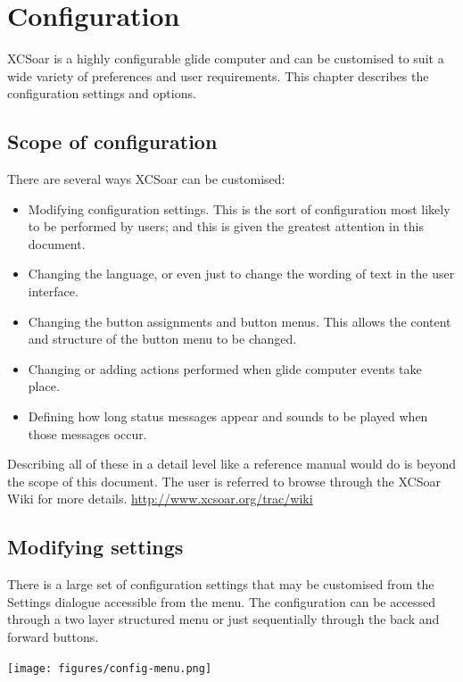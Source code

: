 \chapter{Configuration}\label{cha:configuration}
XCSoar is a highly configurable glide computer and can be customised
to suit a wide variety of preferences and user requirements.  This
chapter describes the configuration settings and options.

\section{Scope of configuration}

There are several ways XCSoar can be customised:
\begin{itemize}

\item Modifying configuration settings.  This is the sort of configuration
  most likely to be performed by users; and this is given the greatest attention 
  in this document.
\item Changing the language, or even just to change the wording
  of text in the user interface.
\item Changing the button assignments and button menus.  This allows 
  the content and structure of the button menu to be changed. 
\item Changing or adding actions performed when glide computer events
  take place.
\item Defining how long status messages appear and sounds to be played
  when those messages occur.
\end{itemize}
Describing all of these in a detail level like a reference manual would 
do is beyond the scope of this document. The user is referred to browse 
through the XCSoar Wiki for more details. 
\url{http://www.xcsoar.org/trac/wiki}

\section{Modifying settings}

There is a large set of configuration settings that may be customised
from the Settings dialogue accessible from the menu.
The configuration can be accessed through a two layer structured menu 
or just sequentially through the back and forward buttons.

\begin{center}
\texttt{[image: figures/config-menu.png]}
\end{center}

